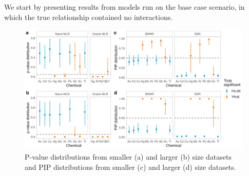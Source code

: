 \documentclass[12pt, twoside]{amherstthesis}
\begin{document}
We start by presenting results from models run on the base case scenario, in which the true relationship contained no interactions.
\begin{figure}

{\centering \includegraphics[width=1\linewidth]{figures/ch4_basecasesig} 

}

\caption{P-value distributions from smaller (a) and larger (b) size datasets and PIP distributions from smaller (c) and larger (d) size datasets.}\label{fig:basecasesig}
\end{figure}
\end{document}
